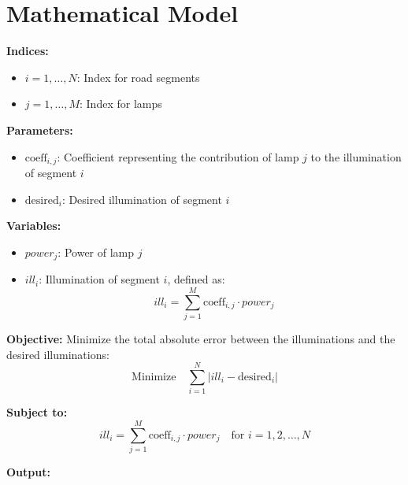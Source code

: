\documentclass{article}
\begin{document}
\section*{Mathematical Model}

\textbf{Indices:}
\begin{itemize}
    \item $i = 1, \ldots, N$: Index for road segments
    \item $j = 1, \ldots, M$: Index for lamps
\end{itemize}

\textbf{Parameters:}
\begin{itemize}
    \item $\text{coeff}_{i,j}$: Coefficient representing the contribution of lamp $j$ to the illumination of segment $i$
    \item $\text{desired}_i$: Desired illumination of segment $i$
\end{itemize}

\textbf{Variables:}
\begin{itemize}
    \item $power_j$: Power of lamp $j$
    \item $ill_i$: Illumination of segment $i$, defined as:
    \[
    ill_i = \sum_{j=1}^{M} \text{coeff}_{i,j} \cdot power_j
    \]
\end{itemize}

\textbf{Objective:} 
Minimize the total absolute error between the illuminations and the desired illuminations:
\[
\text{Minimize} \quad \sum_{i=1}^{N} |ill_i - \text{desired}_i|
\]

\textbf{Subject to:}
\[
ill_i = \sum_{j=1}^{M} \text{coeff}_{i,j} \cdot power_j \quad \text{for } i = 1, 2, \ldots, N
\]

\textbf{Output:}
\end{document}

